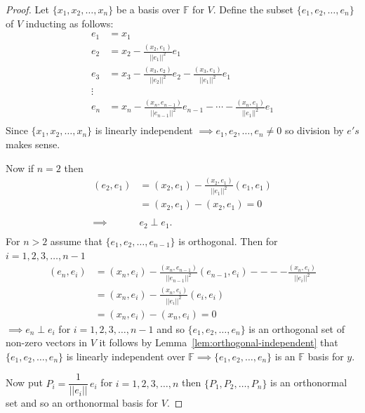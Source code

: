 \documentclass[11pt,a4paper]{article}
\theoremstyle{definition}
\begin{document}
\begin{proof}
Let $\{x_1,x_2,\dots,x_n\}$ be a basis over $\mathbb{F}$ for $V$. Define the subset $\{e_1,e_2,\dots,e_n\}$ of $V$ inducting as follows:
\begin{align*}
e_1 &=x_1\\
e_2 &=x_2-\frac{(x_2,e_1)}{||e_1||^2}e_1\\
e_3 &=x_3-\frac{(x_3,e_2)}{||e_2||^2}e_2-\frac{(x_3,e_1)}{||e_1||^2}e_1\\
\vdots\\
e_n &=x_n-\frac{(x_n,e_{n-1})}{||e_{n-1}||^2}e_{n-1}-\cdots-\frac{(x_n,e_1)}{||e_1||^2}e_1\\
\end{align*}
Since $\{x_1,x_2,\dots,x_n\}$ is linearly independent $\implies e_1, e_2,\dots,e_n\neq 0$ so division by $e's$ makes sense.

Now if $n=2$ then 
\begin{align*}
(e_2,e_1) &=(x_2,e_1)-\frac{(x_2,e_1)}{||e_1||^2}(e_1,e_1)\\
          &=(x_2,e_1)-(x_2,e_1)=0\\\\
      \implies &e_2\perp e_1.\\
\end{align*}
For $n>2$ assume that $\{e_1,e_2,\dots,e_{n-1}\}$ is orthogonal. Then for $i=1,2,3,\dots,n-1$
\begin{align*}
(e_n,e_i) &=(x_n,e_i)-\frac{(x_n,e_{n-1})}{||e_{n-1}||^2}(e_{n-1},e_i)----\frac{(x_n,e_i)}{||e_i||^2}\\
          &=(x_n,e_i)-\frac{(x_n,e_i)}{||e_i||^2}(e_i,e_i)\\
          &=(x_n,e_i)-(x_n,e_i)=0
\end{align*}
$\implies e_n\perp e_i$ for $i=1,2,3,\dots,n-1$ and so $\{e_1,e_2,\dots,e_n\}$ is an orthogonal set of non-zero vectors in $V$ it follows by Lemma~\ref{lem:orthogonal-independent} that $\{e_1,e_2,\dots,e_n\}$ is linearly independent over $\mathbb{F}\implies \{e_1,e_2,\dots,e_n\}$ is an $\mathbb{F}$ basis for $y$.

Now put $P_i=\dfrac{1}{||e_i||}\,e_i$ for $i=1,2,3,\dots,n$ then $\{P_1,P_2,\dots,P_n\}$ is an orthonormal set and so an orthonormal basis for $V$.
\end{proof}
\end{document}
